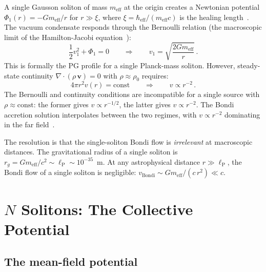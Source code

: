 \documentclass[12pt, a4paper]{article}
\newcommand{\meff}{m_{\mathrm{eff}}}
\newcommand{\heff}{\hbar_{\mathrm{eff}}}
\newcommand{\lP}{\ell_{\mathrm{P}}}
\begin{document}
A single Gausson soliton of mass $\meff$ at the
origin creates a Newtonian potential
$\Phi_1(r) = -G\meff/r$ for $r \gg \xi$, where
$\xi = \heff/(\meff c)$ is the healing
length~\cite{kulangiev_2026e}. The vacuum condensate
responds through the Bernoulli relation (the
macroscopic limit of the Hamilton-Jacobi
equation~\cite{kulangiev_2026a}):
\begin{equation}
    \frac{1}{2}v_1^2 + \Phi_1 = 0
    \qquad\Longrightarrow\qquad
    v_1 = \sqrt{\frac{2G\meff}{r}}\,.
\label{eq:v_single_bernoulli}
\end{equation}
This is formally the PG profile for a single Planck-mass
soliton. However, steady-state continuity
$\nabla\cdot(\rho\,\mathbf{v}) = 0$ with
$\rho \approx \rho_0$ requires:
\begin{equation}
    4\pi r^2 v(r) = \text{const}
    \qquad\Longrightarrow\qquad
    v \propto r^{-2}\,.
\label{eq:bondi}
\end{equation}
The Bernoulli and continuity conditions are
incompatible for a single source with
$\rho \approx \text{const}$: the former gives
$v \propto r^{-1/2}$, the latter gives
$v \propto r^{-2}$. The Bondi accretion solution
interpolates between the two regimes, with
$v \propto r^{-2}$ dominating in the far
field~\cite{bondi_1952,kulangiev_2026a}.

The resolution is that the single-soliton Bondi
flow is \emph{irrelevant} at macroscopic distances.
The gravitational radius of a single soliton is
$r_g = G\meff/c^2 \sim \lP \sim 10^{-35}$~m. At
any astrophysical distance $r \gg \lP$, the
Bondi flow of a single soliton is negligible:
$v_{\mathrm{Bondi}} \sim G\meff/(c\,r^2) \ll c$.


\section{\texorpdfstring{$N$}{N} Solitons: The Collective Potential}
\label{sec:collective}

\subsection{The mean-field potential}
\end{document}
